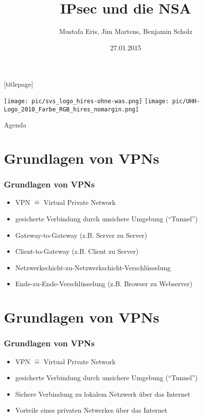 \documentclass[t]{beamer}
\title{IPsec und die NSA}
\author[Eris, Martens, Scholz]{Mustafa Eris, Jim Martens, Benjamin Scholz}
\institute[Uni Hamburg]{Universität Hamburg\\ Fachbereich Informatik}
\date{27.01.2015}
\begin{document}
\begingroup
	[titlepage]
	\begin{frame}[plain]
		\vskip8mm
		\texttt{[image: pic/svs\_logo\_hires-ohne-was.png]}
		\vskip-20mm %
		\titlepage
		\vspace{\fill}
		\texttt{[image: pic/UHH-Logo\_2010\_Farbe\_RGB\_hires\_nomargin.png]}
		\vskip20pt
	\end{frame}
\endgroup

\begin{frame}{Agenda}
	\tableofcontents
\end{frame}

\section{Grundlagen von VPNs}
\begin{frame}
	\frametitle{Grundlagen von VPNs}
	\begin{itemize}
		\item VPN \(\widehat{=}\) Virtual Private Network
		\item gesicherte Verbindung durch unsichere Umgebung ("`Tunnel"')
		\item Gateway-to-Gateway (z.B. Server zu Server)
		\item Client-to-Gateway (z.B. Client zu Server)
		\item Netzwerkschicht-zu-Netzwerkschicht-Verschlüsselung
		\item Ende-zu-Ende-Verschlüsselung (z.B. Browser zu Webserver)
	\end{itemize}
\end{frame}

\section{Grundlagen von VPNs}
\begin{frame}
	\frametitle{Grundlagen von VPNs}
	\begin{itemize}
		\vfill
		\item VPN \(\widehat{=}\) Virtual Private Network
		\vfill
		\item gesicherte Verbindung durch unsichere Umgebung ("`Tunnel"')
		\vfill
		\item Sichere Verbindung zu lokalem Netzwerk über das Internet
		\vfill
		\item Vorteile eines privaten Netwerkes über das Internet
		\vfill
	\end{itemize}
\end{frame}
\end{document}
